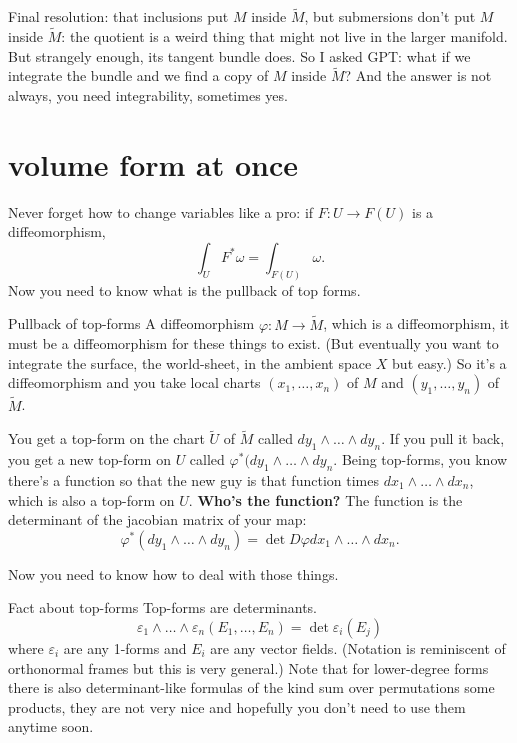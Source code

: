 Final resolution: that inclusions put \(M\) inside \(\widetilde{M}\), but submersions don't put \(M\) inside \(\widetilde{M}\): the quotient is a weird thing that might not live in the larger manifold. But strangely enough, its tangent bundle does. So I asked GPT: what if we integrate the bundle and we find a copy of \(M\) inside \(\widetilde{M}\)? And the answer is not always, you need integrability, sometimes yes.

\section{volume form at once}

Never forget how to change variables like a pro: if \(F:U \to F(U)\) is a diffeomorphism,
\[\int_U F^*\omega=\int_{F(U)}\omega.\]
Now you need to know what is the pullback of top forms. 

\begin{thing7}{Pullback of top-forms}\leavevmode
A diffeomorphism \(\varphi:M \to \widetilde M\), which is a diffeomorphism, it must be a diffeomorphism for these things to exist. (But eventually you want to integrate the surface, the world-sheet, in the ambient space \(X\) but easy.) So it's a diffeomorphism and you take local charts \((x_1,\ldots,x_n)\) of \(M\) and \((y_1,\ldots,y_n)\) of \(\widetilde{M}\).

You get a top-form on the chart \(\widetilde{U}\) of \(\widetilde{M}\) called \(dy_1\wedge\ldots \wedge dy_n\). If you pull it back, you get a new top-form on \(U\) called \(\varphi^*(dy_1\wedge\ldots \wedge dy_n\). Being top-forms, you know there's a function so that the new guy is that function times \(dx_1\wedge\ldots\wedge dx_n\), which is also a top-form on \(U\). \textbf{Who's the function?} The function is the determinant of the jacobian matrix of your map:
\[\varphi^*(dy_1\wedge\ldots\wedge dy_n)=\det D\varphi dx_1\wedge\ldots\wedge dx_n.\]
\end{thing7}

Now you need to know how to deal with those things.
\begin{thing7}{Fact about top-forms}\leavevmode
Top-forms are determinants.
\[\varepsilon_1 \wedge \ldots \wedge \varepsilon_n(E_1,\ldots,E_n)=\det \varepsilon_i(E_j)\]
where \(\varepsilon_i\) are any 1-forms and \(E_i\) are any vector fields. (Notation is reminiscent of orthonormal frames but this is very general.) Note that for lower-degree forms there is also determinant-like formulas of the kind sum over permutations some products, they are not very nice and hopefully you don't need to use them anytime soon.
\end{thing7}

